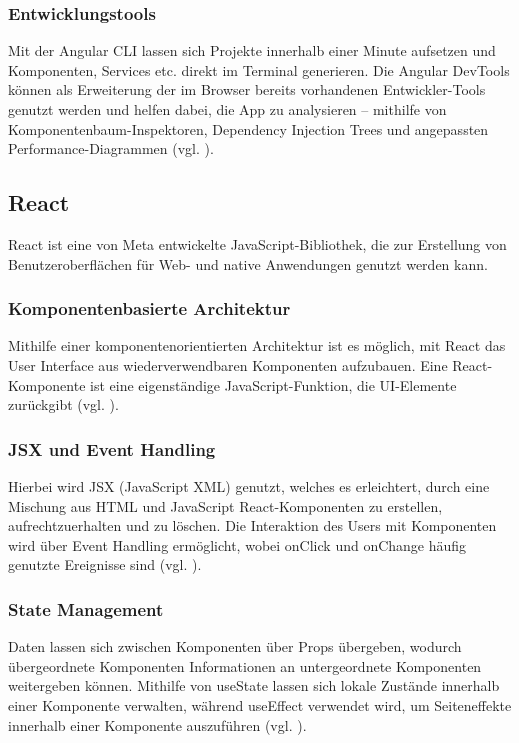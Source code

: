 \documentclass[oneside]{ausarbeitung}
\begin{document}
\subsubsection{Entwicklungstools}
Mit der Angular CLI lassen sich Projekte innerhalb einer Minute aufsetzen und Komponenten, Services etc. direkt im Terminal generieren. Die Angular DevTools können als Erweiterung der im Browser bereits vorhandenen Entwickler-Tools genutzt werden und helfen dabei, die App zu analysieren – mithilfe von Komponentenbaum-Inspektoren, Dependency Injection Trees und angepassten Performance-Diagrammen (vgl. \parencite{angular}).

\subsection{React}
React ist eine von Meta entwickelte JavaScript-Bibliothek, die zur Erstellung von Benutzeroberflächen für Web- und native Anwendungen genutzt werden kann.

\subsubsection{Komponentenbasierte Architektur}
Mithilfe einer komponentenorientierten Architektur ist es möglich, mit React das User Interface aus wiederverwendbaren Komponenten aufzubauen. Eine React-Komponente ist eine eigenständige JavaScript-Funktion, die UI-Elemente zurückgibt (vgl. \parencite{react}).

\subsubsection{JSX und Event Handling}
Hierbei wird JSX (JavaScript XML) genutzt, welches es erleichtert, durch eine Mischung aus HTML und JavaScript React-Komponenten zu erstellen, aufrechtzuerhalten und zu löschen. Die Interaktion des Users mit Komponenten wird über Event Handling ermöglicht, wobei onClick und onChange häufig genutzte Ereignisse sind (vgl. \parencite{react}).

\subsubsection{State Management}
Daten lassen sich zwischen Komponenten über Props übergeben, wodurch übergeordnete Komponenten Informationen an untergeordnete Komponenten weitergeben können. Mithilfe von useState lassen sich lokale Zustände innerhalb einer Komponente verwalten, während useEffect verwendet wird, um Seiteneffekte innerhalb einer Komponente auszuführen (vgl. \parencite{react}).
\end{document}
